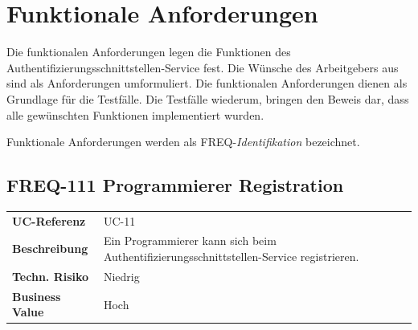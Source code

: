 \newpage

\section{Funktionale Anforderungen}\label{funktionale-anforderungen}

Die funktionalen Anforderungen legen die Funktionen des
Authentifizierungsschnittstellen-Service fest. Die Wünsche des
Arbeitgebers aus sind als Anforderungen umformuliert. Die funktionalen
Anforderungen dienen als Grundlage für die Testfälle. Die Testfälle
wiederum, bringen den Beweis dar, dass alle gewünschten Funktionen
implementiert wurden.

Funktionale Anforderungen werden als FREQ-\emph{Identifikation}
bezeichnet.

\subsection{FREQ-111 Programmierer
Registration}\label{freq-111-programmierer-registration}

\begin{longtable}[c]{@{}ll@{}}
\toprule
\begin{minipage}[t]{0.20\columnwidth}\raggedright\strut
\textbf{UC-Referenz}
\strut\end{minipage} &
\begin{minipage}[t]{0.74\columnwidth}\raggedright\strut
UC-11
\strut\end{minipage}\tabularnewline
\begin{minipage}[t]{0.20\columnwidth}\raggedright\strut
\textbf{Beschreibung}
\strut\end{minipage} &
\begin{minipage}[t]{0.74\columnwidth}\raggedright\strut
Ein Programmierer kann sich beim
Authentifizierungsschnittstellen-Service registrieren.
\strut\end{minipage}\tabularnewline
\begin{minipage}[t]{0.20\columnwidth}\raggedright\strut
\textbf{Techn. Risiko}
\strut\end{minipage} &
\begin{minipage}[t]{0.74\columnwidth}\raggedright\strut
Niedrig
\strut\end{minipage}\tabularnewline
\begin{minipage}[t]{0.20\columnwidth}\raggedright\strut
\textbf{Business Value}
\strut\end{minipage} &
\begin{minipage}[t]{0.74\columnwidth}\raggedright\strut
Hoch
\strut\end{minipage}\tabularnewline
\bottomrule
\end{longtable}

